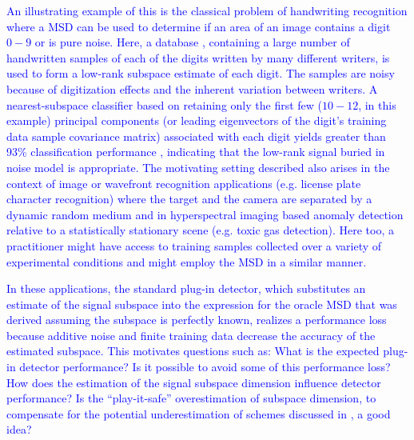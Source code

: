 \textcolor{blue}{An illustrating example of this is the classical problem of handwriting recognition \cite[Chapter 10]{elden2007matrix} where a MSD can be used to determine if an area of an image contains a digit $0-9$ or is pure noise. Here, a database \cite{hwritingurl}, containing a large number of handwritten samples of each of the digits written by many different writers, is used to form a low-rank subspace estimate of each digit. The samples are noisy because of digitization effects and the inherent variation between writers. A nearest-subspace classifier based on retaining only the first few ($10-12$, in this example) principal components (or leading eigenvectors of the digit's training data sample covariance matrix) associated with each digit yields greater than 93\% classification performance \cite[Table 10.1, pp. 121]{elden2007matrix}, indicating that the low-rank signal buried in noise model is appropriate. The motivating setting described also arises in the context of image or wavefront recognition applications (e.g. license plate character recognition) where the target and the camera are separated by a dynamic random medium and in hyperspectral imaging based anomaly detection  \cite{thai2002invariant,healey1999models,kwon2006kernel} relative to a statistically stationary scene (e.g. toxic gas detection). Here too, a practitioner might have access to training samples collected over a variety of experimental conditions and might employ the MSD in a similar manner.}

\textcolor{blue}{In these applications, the standard plug-in detector, which substitutes an estimate of the signal subspace into the expression for the oracle MSD that was derived assuming the subspace is perfectly known, realizes a performance loss because additive noise and finite training data decrease the accuracy of the estimated subspace. This motivates questions such as: What is the expected plug-in detector performance? Is it possible to avoid some of this performance loss? How does the estimation of the signal subspace dimension influence detector  performance? Is the ``play-it-safe''  overestimation of subspace dimension, to compensate for the potential underestimation of schemes discussed in \cite{nadakuditi2008sample} , a good idea? }

